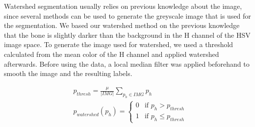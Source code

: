 \documentclass[pdftex,12pt,a4paper]{report}
\begin{document}
Watershed segmentation usually relies on previous knowledge about the image, since several methods can be used to generate the greyscale image that is used for the segmentation. We based our watershed method on the previous knowledge that the bone is slightly darker than the background in the H channel of the HSV image space. To generate the image used for watershed, we used a threshold calculated from the mean color of the H channel and applied watershed afterwards. Before using the data, a local median filter was applied beforehand to smooth the image and the resulting labels.

\begin{equation}
\begin{split}
& p_{thresh} = \frac{\mu}{|IMG|} \sum_{p_h \in IMG} p_h \\
& p_{watershed}(p_h) = \begin{cases} 0 & \text{if } p_h > p_{thresh} \\ 1 & \text{if } p_h \leq p_{thresh} \end{cases}
\end{split}
\end{equation}
\end{document}
